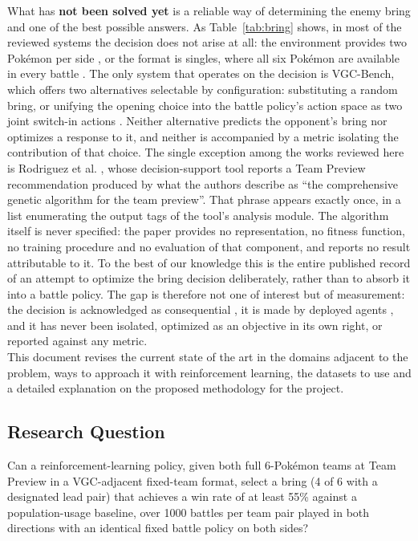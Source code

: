 \documentclass[conference]{IEEEtran}
\begin{document}
What has \textbf{not been solved yet} is a reliable way of determining the enemy bring and one of the best possible answers. As Table~\ref{tab:bring} shows, in most of the reviewed systems the decision does not arise at all: the environment provides two Pok\'emon per side
\cite{simoes2020}, or the format is singles, where all six Pok\'emon are
available in every battle \cite{huang2019, grigsby2025, karten2026}. The only
system that operates on the decision is VGC-Bench, which offers two
alternatives selectable by configuration: substituting a random bring, or
unifying the opening choice into the battle policy's action space as two joint
switch-in actions \cite{angliss2026}. Neither alternative predicts the
opponent's bring nor optimizes a response to it, and neither is accompanied by
a metric isolating the contribution of that choice. The single exception among the works reviewed here is Rodriguez et al. \cite{rodriguez2024}, whose decision-support tool reports a Team Preview
recommendation produced by what the authors describe as ``the comprehensive
genetic algorithm for the team preview''. That phrase appears exactly once, in
a list enumerating the output tags of the tool's analysis module. The algorithm
itself is never specified: the paper provides no representation, no fitness
function, no training procedure and no evaluation of that component, and
reports no result attributable to it. To the best of our knowledge this is the
entire published record of an attempt to optimize the bring decision
deliberately, rather than to absorb it into a battle policy. The gap is
therefore not one of interest but of measurement: the decision is acknowledged
as consequential \cite{reis2021, angliss2026}, it is made by deployed agents
\cite{angliss2026}, and it has never been isolated, optimized as an objective
in its own right, or reported against any metric.\\
This document revises the current state of the art in the domains adjacent to the problem, ways to approach it with reinforcement learning, the datasets to use and a detailed explanation on the proposed methodology for the project. 

\subsection{Research Question}
Can a reinforcement-learning policy, given both full 6-Pokémon teams at Team Preview in a VGC-adjacent fixed-team format, select a bring (4 of 6 with a designated lead pair) that achieves a win rate of at least 55\% against a population-usage baseline, over 1000 battles per team pair played in both directions with an identical fixed battle policy on both sides? 
\end{document}
